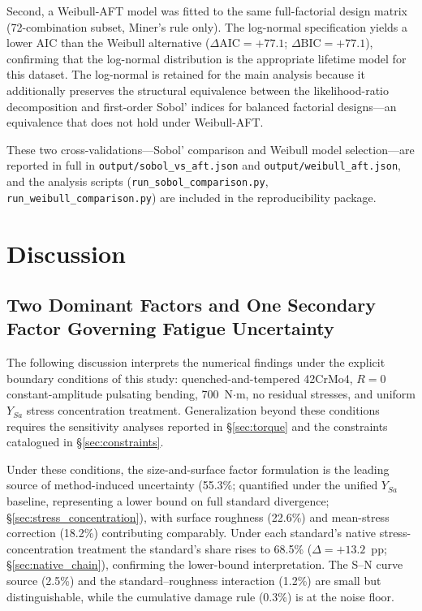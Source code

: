 \documentclass[twocolumn,12pt,a4paper]{article}
\begin{document}
Second, a Weibull-AFT model was fitted to the same full-factorial
design matrix (72-combination subset, Miner's rule only). The
log-normal specification yields a lower AIC than the Weibull
alternative ($\Delta\mathrm{AIC} = +77.1$; $\Delta\mathrm{BIC} =
+77.1$), confirming that the log-normal distribution is the
appropriate lifetime model for this dataset. The log-normal is
retained for the main analysis because it additionally preserves the
structural equivalence between the likelihood-ratio decomposition and
first-order Sobol' indices for balanced factorial designs---an
equivalence that does not hold under Weibull-AFT.

These two cross-validations---Sobol' comparison and Weibull model
selection---are reported in full in \texttt{output/sobol\_vs\_aft.json}
and \texttt{output/weibull\_aft.json}, and the analysis scripts
(\texttt{run\_sobol\_comparison.py}, \texttt{run\_weibull\_comparison.py})
are included in the reproducibility package.

\section{Discussion}
\label{sec:discussion}

\subsection{Two Dominant Factors and One Secondary Factor Governing Fatigue Uncertainty}

The following discussion interprets the numerical findings under the
explicit boundary conditions of this study: quenched-and-tempered
42CrMo4, $R=0$ constant-amplitude pulsating bending, 700~N$\cdot$m,
no residual stresses, and uniform $Y_{Sa}$ stress concentration
treatment. Generalization beyond these conditions requires the
sensitivity analyses reported in \S\ref{sec:torque} and the
constraints catalogued in \S\ref{sec:constraints}.

Under these conditions, the size-and-surface factor formulation is
the leading source of method-induced uncertainty (55.3\%; quantified %
under the unified $Y_{Sa}$ baseline, representing a lower bound on
full standard divergence; \S\ref{sec:stress_concentration}), with
surface roughness (22.6\%) and mean-stress correction (18.2\%)
contributing comparably. Under each standard's native
stress-concentration treatment the standard's share rises to 68.5\%
($\Delta=+13.2$~pp; \S\ref{sec:native_chain}), confirming the
lower-bound interpretation. The S--N curve source (2.5\%) and the
standard--roughness interaction (1.2\%) are small but distinguishable,
while the cumulative damage rule (0.3\%) is at the noise floor.
\end{document}
